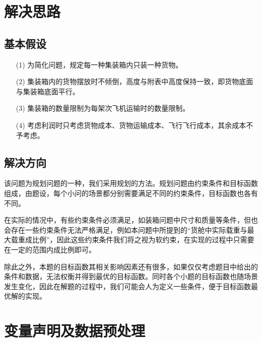 \documentclass{article}
\begin{document}
	\section{解决思路}
	\subsection{基本假设}
	\begin{itemize}
		\item[(1)]为简化问题，规定每一种集装箱内只装一种货物。
		\item[(2)]集装箱内的货物摆放时不倾倒，高度与附表中高度保持一致，即货物底面与集装箱底面平行。
		\item[(3)]集装箱的数量限制为每架次飞机运输时的数量限制。
		\item[(4)]考虑利润时只考虑货物成本、货物运输成本、飞行飞行成本，其余成本不予考虑。
	\end{itemize}
	
	\subsection{解决方向}
	该问题为规划问题的一种，我们采用规划的方法。规划问题由约束条件和目标函数组成，由题设，每个小问的场景都分别需要满足不同的约束条件，目标函数也各有不同。
	
	在实际的情况中，有些约束条件必须满足，如装箱问题中尺寸和质量等条件，但也会存在一些约束条件无法严格满足，例如本问题中所提到的“货舱中实际载重与最大载重成比例”，因此这些约束条件我们将之视为软约束，在实现的过程中只需要在一定的范围内成比例即可。
	
	除此之外，本题的目标函数其相关影响因素还有很多，如果仅仅考虑题目中给出的条件和数据，无法权衡并得到最优的目标函数。同时各个小题的目标函数也随场景发生变化，因此在解题的过程中，我们可能会人为定义一些条件，便于目标函数最优解的实现。	
	
	\section{变量声明及数据预处理}
\end{document}
